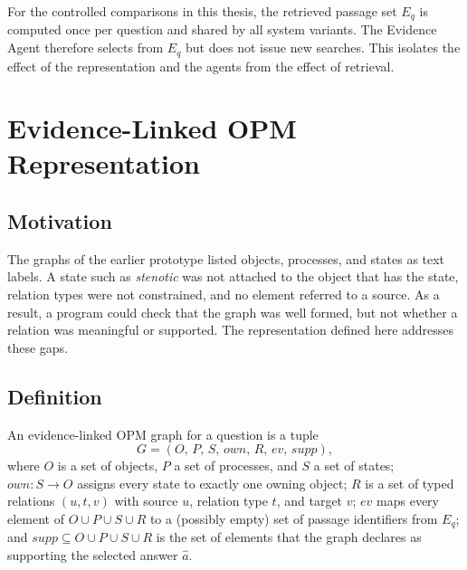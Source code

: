 For the controlled comparisons in this thesis, the retrieved passage set $E_q$ is computed once per question and shared by all system variants. The Evidence Agent therefore selects from $E_q$ but does not issue new searches. This isolates the effect of the representation and the agents from the effect of retrieval.

\section{Evidence-Linked OPM Representation}
\label{sec:graph_contract}

\subsection{Motivation}

The graphs of the earlier prototype listed objects, processes, and states as text labels. A state such as \emph{stenotic} was not attached to the object that has the state, relation types were not constrained, and no element referred to a source. As a result, a program could check that the graph was well formed, but not whether a relation was meaningful or supported. The representation defined here addresses these gaps.

\subsection{Definition}

\begin{definition}
\label{def:graph}
An evidence-linked OPM graph for a question is a tuple
\begin{equation}
  G = (O,\, P,\, S,\, \mathit{own},\, R,\, \mathit{ev},\, \mathit{supp}),
  \label{eq:graph}
\end{equation}
where $O$ is a set of objects, $P$ a set of processes, and $S$ a set of states; $\mathit{own}: S \to O$ assigns every state to exactly one owning object; $R$ is a set of typed relations $(u, t, v)$ with source $u$, relation type $t$, and target $v$; $\mathit{ev}$ maps every element of $O \cup P \cup S \cup R$ to a (possibly empty) set of passage identifiers from $E_q$; and $\mathit{supp} \subseteq O \cup P \cup S \cup R$ is the set of elements that the graph declares as supporting the selected answer $\hat{a}$.
\end{definition}

